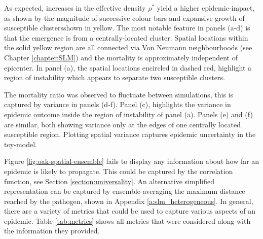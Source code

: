 As expected, increases in the effective density $\rho^*$ yield a higher epidemic-impact, as shown by the magnitude of successive colour bars %
and expansive growth of susceptible clusters\textemdash shown in yellow. %
The most notable feature in panels (a-d) is that the  emergence is from a centrally-located cluster. %
Spatial locations within the solid yellow region are all connected via Von Neumann neighbourhoods (see Chapter \ref{chapter:SLM}) and the mortality is approximately independent of epicenter. %
In panel (a), the spatial locations encircled in dashed red, highlight a region of instability which appears to separate two susceptible clusters. %

The mortality ratio was observed to fluctuate between simulations, this is captured by variance in panels (d-f). %
Panel (c), highlights the variance in epidemic outcome inside the region of instability of panel (a). %
Panels (e) and (f) are similar, both showing variance only at the edges of one centrally located susceptible region. %
Plotting spatial variance captures epidemic uncertainty in the toy-model. %

Figure \ref{fig:oak-spatial-ensemble} fails to display any information about how far an epidemic is likely to propagate. %
This could be captured by the correlation function, see Section \ref{section:universality}. %
An alternative simplified representation can be captured by ensemble-averaging the maximum distance reached by the pathogen, %
shown in Appendix \ref{a:slm_heterogeneous}. %
In general, there are a variety of metrics that could be used to capture various aspects of an epidemic. %
Table \ref{tab:metrics} shows all metrics that were considered along with the information they provided. %

